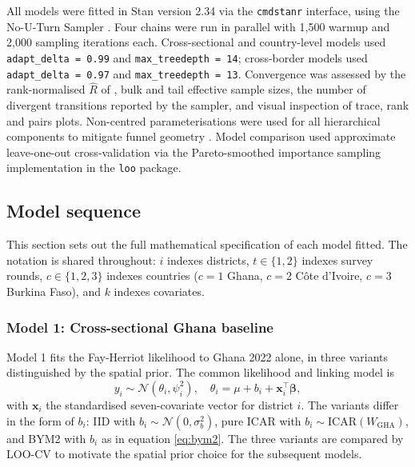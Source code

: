 \documentclass{article}
\begin{document}
All models were fitted in Stan version 2.34 \citep{stan2024} via the
\texttt{cmdstanr} interface, using the No-U-Turn Sampler
\citep{hoffman2014}. Four chains were run in parallel with 1,500 warmup
and 2,000 sampling iterations each. Cross-sectional and country-level
models used \texttt{adapt\_delta\ =\ 0.99} and
\texttt{max\_treedepth\ =\ 14}; cross-border models used
\texttt{adapt\_delta\ =\ 0.97} and \texttt{max\_treedepth\ =\ 13}.
Convergence was assessed by the rank-normalised \(\hat{R}\) of
\citep{vehtari2021}, bulk and tail effective sample sizes, the number of
divergent transitions reported by the sampler, and visual inspection of
trace, rank and pairs plots. Non-centred parameterisations were used for
all hierarchical components to mitigate funnel geometry
\citep{betancourt2015}. Model comparison used approximate leave-one-out
cross-validation \citep{vehtari2017} via the Pareto-smoothed importance
sampling implementation in the \texttt{loo} package.

\subsection{Model sequence}\label{model-sequence}

This section sets out the full mathematical specification of each model
fitted. The notation is shared throughout: \(i\) indexes districts,
\(t \in \{1, 2\}\) indexes survey rounds, \(c \in \{1, 2, 3\}\) indexes
countries (\(c = 1\) Ghana, \(c = 2\) Côte d'Ivoire, \(c = 3\) Burkina
Faso), and \(k\) indexes covariates.

\subsubsection{Model 1: Cross-sectional Ghana
baseline}\label{model-1-cross-sectional-ghana-baseline}

Model 1 fits the Fay-Herriot likelihood to Ghana 2022 alone, in three
variants distinguished by the spatial prior. The common likelihood and
linking model is \begin{equation}
y_i \sim \mathcal{N}(\theta_i, \psi_i^2), \quad
\theta_i = \mu + b_i + \mathbf{x}_i^{\top}\bm{\beta},
\end{equation} with \(\mathbf{x}_i\) the standardised seven-covariate
vector for district \(i\). The variants differ in the form of \(b_i\):
IID with \(b_i \sim \mathcal{N}(0, \sigma_b^2)\), pure ICAR with
\(b_i \sim \mathrm{ICAR}(W_{\text{GHA}})\), and BYM2 with \(b_i\) as in
equation \ref{eq:bym2}. The three variants are compared by LOO-CV
\citep{vehtari2017} to motivate the spatial prior choice for the
subsequent models.
\end{document}
